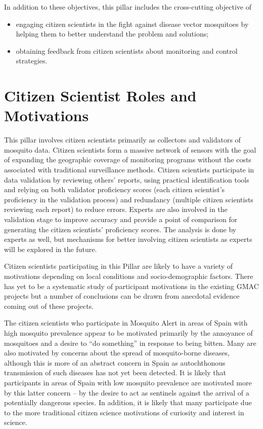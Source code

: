 \documentclass[]{article}
\providecommand{\tightlist}{%
  \setlength{\itemsep}{0pt}\setlength{\parskip}{0pt}}
\begin{document}
In addition to these objectives, this pillar includes the cross-cutting objective of

\begin{itemize}
\tightlist
\item
  engaging citizen scientists in the fight against disease vector mosquitoes by helping them to better understand the problem and solutions;
\item
  obtaining feedback from citizen scientists about monitoring and control strategies.
\end{itemize}

\hypertarget{citizen-scientist-roles-and-motivations}{%
\section{Citizen Scientist Roles and Motivations}\label{citizen-scientist-roles-and-motivations}}

This pillar involves citizen scientists primarily as collectors and validators of mosquito data. Citizen scientists form a massive network of sensors with the goal of expanding the geographic coverage of monitoring programs without the costs associated with traditional surveillance methods. Citizen scientists participate in data validation by reviewing others' reports, using practical identification tools and relying on both validator proficiency scores (each citizen scientist's proficiency in the validation process) and redundancy (multiple citizen scientists reviewing each report) to reduce errors. Experts are also involved in the validation stage to improve accuracy and provide a point of comparison for generating the citizen scientists' proficiency scores. The analysis is done by experts as well, but mechanisms for better involving citizen scientists as experts will be explored in the future.

Citizen scientists participating in this Pillar are likely to have a variety of motivations depending on local conditions and socio-demographic factors. There has yet to be a systematic study of participant motivations in the existing GMAC projects but a number of conclusions can be drawn from anecdotal evidence coming out of these projects.

The citizen scientists who participate in Mosquito Alert in areas of Spain with high mosquito prevalence appear to be motivated primarily by the annoyance of mosquitoes and a desire to ``do something'' in response to being bitten. Many are also motivated by concerns about the spread of mosquito-borne diseases, although this is more of an abstract concern in Spain as autochthonous transmission of such diseases has not yet been detected. It is likely that participants in areas of Spain with low mosquito prevalence are motivated more by this latter concern -- by the desire to act as sentinels against the arrival of a potentially dangerous species. In addition, it is likely that many participate due to the more traditional citizen science motivations of curiosity and interest in science.
\end{document}

